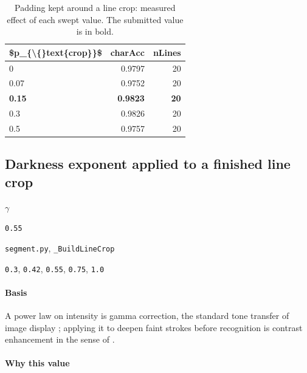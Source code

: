 \begin{table}[htbp]
\centering
\small
\caption{Padding kept around a line crop: measured effect of each swept value. The submitted value is in bold.}
\begin{tabular}{lrr}
\toprule
\$p\_\{\textbackslash\{\}text\{crop\}\}\$ & \textsf{charAcc} & \textsf{nLines} \\
\midrule
0 & 0.9797 & 20 \\
0.07 & 0.9752 & 20 \\
\bfseries 0.15 & \bfseries 0.9823 & \bfseries 20 \\
0.3 & 0.9826 & 20 \\
0.5 & 0.9757 & 20 \\
\bottomrule
\end{tabular}
\end{table}

\subsection{Darkness exponent applied to a finished line crop}

\label{coef:darkness-gamma}

\begin{description}[leftmargin=5.2em,style=sameline]

\item[Symbol] $\gamma$

\item[Value] \texttt{0.55}

\item[Source] \texttt{segment.py}, \texttt{\_BuildLineCrop}

\item[Swept] \texttt{0.3}, \texttt{0.42}, \texttt{0.55}, \texttt{0.75}, \texttt{1.0}

\end{description}

\paragraph{Basis}

A power law on intensity is gamma correction, the standard tone transfer of image display \cite{itu601}; applying it to deepen faint strokes before recognition is contrast enhancement in the sense of \cite{haralick1987}.

\paragraph{Why this value}

